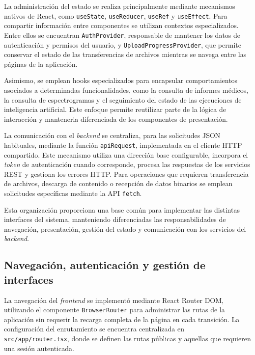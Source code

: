 La administración del estado se realiza principalmente
mediante mecanismos nativos de React, como
\texttt{useState}, \texttt{useReducer},
\texttt{useRef} y \texttt{useEffect}.
Para compartir información entre componentes
se utilizan contextos especializados.
Entre ellos se encuentran \texttt{AuthProvider},
responsable de mantener los datos de autenticación
y permisos del usuario, y
\texttt{UploadProgressProvider}, que permite
conservar el estado de las transferencias de
archivos mientras se navega entre las páginas
de la aplicación.

Asimismo, se emplean hooks especializados
para encapsular comportamientos asociados
a determinadas funcionalidades, como la
consulta de informes médicos, la consulta de espectrogramas y el seguimiento del estado
de las ejecuciones de inteligencia artificial.
Este enfoque permite reutilizar parte de la
lógica de interacción y mantenerla diferenciada
de los componentes de presentación.

La comunicación con el \textit{backend} se centraliza,
para las solicitudes JSON habituales, mediante
la función \texttt{apiRequest}, implementada
en el cliente HTTP compartido. Este mecanismo
utiliza una dirección base configurable,
incorpora el \textit{token} de autenticación cuando
corresponde, procesa las respuestas de los
servicios REST y gestiona los errores HTTP.
Para operaciones que requieren transferencia
de archivos, descarga de contenido o recepción
de datos binarios se emplean solicitudes
específicas mediante la API \texttt{fetch}.

Esta organización proporciona una base común
para implementar las distintas interfaces
del sistema, manteniendo diferenciadas las
responsabilidades de navegación, presentación,
gestión del estado y comunicación con los
servicios del \textit{backend}.


\subsection{Navegación, autenticación y gestión de interfaces}

La navegación del \textit{frontend} se implementó mediante
React Router DOM, utilizando el componente
\texttt{BrowserRouter} para administrar las rutas
de la aplicación sin requerir la recarga completa
de la página en cada transición. La configuración
del enrutamiento se encuentra centralizada en
\texttt{src/app/router.tsx}, donde se definen
las rutas públicas y aquellas que requieren
una sesión autenticada.

